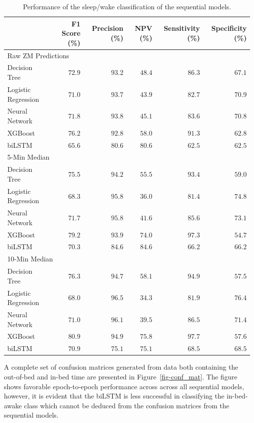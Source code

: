 \documentclass[
  super,
  preprint,
  3p]{elsarticle}
\begin{document}
\hypertarget{tbl-sleep_performance}{}
\begin{longtable}{lrrrrr}
\caption{\label{tbl-sleep_performance}Performance of the sleep/wake classification of the sequential models. }\tabularnewline

\toprule
 & F1 Score (\%) & Precision (\%) & NPV (\%) & Sensitivity (\%) & Specificity (\%) \\ 
\midrule
\multicolumn{6}{l}{Raw ZM Predictions} \\ 
\midrule
Decision Tree & $72.9$ & $93.2$ & $48.4$ & $86.3$ & $67.1$ \\ 
Logistic Regression & $71.0$ & $93.7$ & $43.9$ & $82.7$ & $70.9$ \\ 
Neural Network & $71.8$ & $93.8$ & $45.1$ & $83.6$ & $70.8$ \\ 
XGBoost & $76.2$ & $92.8$ & $58.0$ & $91.3$ & $62.8$ \\ 
biLSTM & $65.6$ & $80.6$ & $80.6$ & $62.5$ & $62.5$ \\ 
\midrule
\multicolumn{6}{l}{5-Min Median} \\ 
\midrule
Decision Tree & $75.5$ & $94.2$ & $55.5$ & $93.4$ & $59.0$ \\ 
Logistic Regression & $68.3$ & $95.8$ & $36.0$ & $81.4$ & $74.8$ \\ 
Neural Network & $71.7$ & $95.8$ & $41.6$ & $85.6$ & $73.1$ \\ 
XGBoost & $79.2$ & $93.9$ & $74.0$ & $97.3$ & $54.7$ \\ 
biLSTM & $70.3$ & $84.6$ & $84.6$ & $66.2$ & $66.2$ \\ 
\midrule
\multicolumn{6}{l}{10-Min Median} \\ 
\midrule
Decision Tree & $76.3$ & $94.7$ & $58.1$ & $94.9$ & $57.5$ \\ 
Logistic Regression & $68.0$ & $96.5$ & $34.3$ & $81.9$ & $76.4$ \\ 
Neural Network & $71.0$ & $96.1$ & $39.5$ & $86.5$ & $71.4$ \\ 
XGBoost & $80.9$ & $94.9$ & $75.8$ & $97.7$ & $57.6$ \\ 
biLSTM & $70.9$ & $75.1$ & $75.1$ & $68.5$ & $68.5$ \\ 
\bottomrule
\end{longtable}

A complete set of confusion matrices generated from data both containing
the out-of-bed and in-bed time are presented in
Figure~\ref{fig-conf_mat}. The figure shows favorable epoch-to-epoch
performance across across all sequential models, however, it is evident
that the biLSTM is less successful in classifying the in-bed-awake class
which cannot be deduced from the confusion matrices from the sequential
models.
\end{document}
